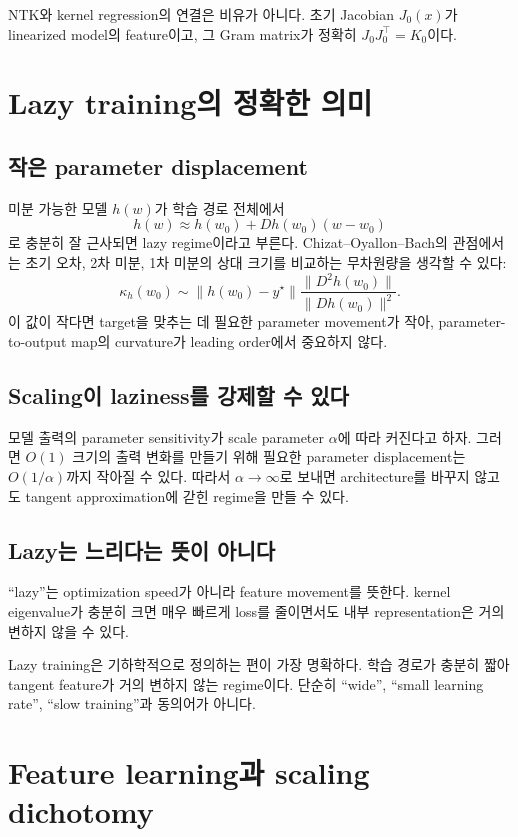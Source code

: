 \documentclass[11pt,a4paper,oneside,openany]{memoir}
\theoremstyle{definition}
\begin{document}
\begin{presentbox}
NTK와 kernel regression의 연결은 비유가 아니다. 초기 Jacobian $J_0(x)$가 linearized model의 feature이고, 그 Gram matrix가 정확히 $J_0J_0^\top=K_0$이다.
\end{presentbox}

\chapter{Lazy training의 정확한 의미}
\section{작은 parameter displacement}
미분 가능한 모델 $h(w)$가 학습 경로 전체에서
\[
h(w)\approx h(w_0)+Dh(w_0)(w-w_0)
\]
로 충분히 잘 근사되면 lazy regime이라고 부른다. Chizat--Oyallon--Bach의 관점에서는 초기 오차, 2차 미분, 1차 미분의 상대 크기를 비교하는 무차원량을 생각할 수 있다:
\[
\kappa_h(w_0)
\sim
\|h(w_0)-y^\star\|
\frac{\|D^2h(w_0)\|}{\|Dh(w_0)\|^2}.
\]
이 값이 작다면 target을 맞추는 데 필요한 parameter movement가 작아, parameter-to-output map의 curvature가 leading order에서 중요하지 않다.

\section{Scaling이 laziness를 강제할 수 있다}
모델 출력의 parameter sensitivity가 scale parameter $\alpha$에 따라 커진다고 하자. 그러면 $O(1)$ 크기의 출력 변화를 만들기 위해 필요한 parameter displacement는 $O(1/\alpha)$까지 작아질 수 있다. 따라서 $\alpha\to\infty$로 보내면 architecture를 바꾸지 않고도 tangent approximation에 갇힌 regime을 만들 수 있다.

\section{Lazy는 느리다는 뜻이 아니다}
``lazy''는 optimization speed가 아니라 feature movement를 뜻한다. kernel eigenvalue가 충분히 크면 매우 빠르게 loss를 줄이면서도 내부 representation은 거의 변하지 않을 수 있다.

\begin{presentbox}
Lazy training은 기하학적으로 정의하는 편이 가장 명확하다. 학습 경로가 충분히 짧아 tangent feature가 거의 변하지 않는 regime이다. 단순히 ``wide'', ``small learning rate'', ``slow training''과 동의어가 아니다.
\end{presentbox}

\chapter{Feature learning과 scaling dichotomy}
\end{document}
